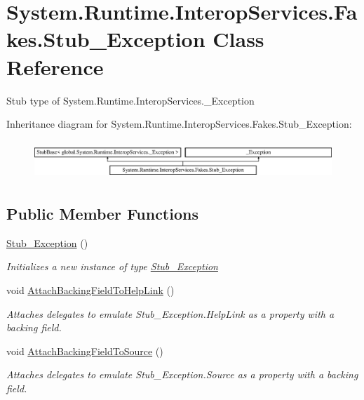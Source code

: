 \hypertarget{class_system_1_1_runtime_1_1_interop_services_1_1_fakes_1_1_stub___exception}{\section{System.\-Runtime.\-Interop\-Services.\-Fakes.\-Stub\-\_\-\-Exception Class Reference}
\label{class_system_1_1_runtime_1_1_interop_services_1_1_fakes_1_1_stub___exception}
}


Stub type of System.\-Runtime.\-Interop\-Services.\-\_\-\-Exception 


Inheritance diagram for System.\-Runtime.\-Interop\-Services.\-Fakes.\-Stub\-\_\-\-Exception\-:\begin{figure}[H]
\begin{center}
\leavevmode
\includegraphics[height=1.465969cm]{class_system_1_1_runtime_1_1_interop_services_1_1_fakes_1_1_stub___exception}
\end{center}
\end{figure}
\subsection*{Public Member Functions}
\begin{DoxyCompactItemize}
\item 
\hyperlink{class_system_1_1_runtime_1_1_interop_services_1_1_fakes_1_1_stub___exception_ab4dd8ebe51051a959bbd43889a4f0c49}{Stub\-\_\-\-Exception} ()
\begin{DoxyCompactList}\small\item\em Initializes a new instance of type \hyperlink{class_system_1_1_runtime_1_1_interop_services_1_1_fakes_1_1_stub___exception}{Stub\-\_\-\-Exception}\end{DoxyCompactList}\item 
void \hyperlink{class_system_1_1_runtime_1_1_interop_services_1_1_fakes_1_1_stub___exception_a67cf826ccd780e8a358b9f160edffc8f}{Attach\-Backing\-Field\-To\-Help\-Link} ()
\begin{DoxyCompactList}\small\item\em Attaches delegates to emulate Stub\-\_\-\-Exception.\-Help\-Link as a property with a backing field.\end{DoxyCompactList}\item 
void \hyperlink{class_system_1_1_runtime_1_1_interop_services_1_1_fakes_1_1_stub___exception_a2309ef77313f645e601e78f57f5b4815}{Attach\-Backing\-Field\-To\-Source} ()
\begin{DoxyCompactList}\small\item\em Attaches delegates to emulate Stub\-\_\-\-Exception.\-Source as a property with a backing field.\end{DoxyCompactList}\end{DoxyCompactItemize}
